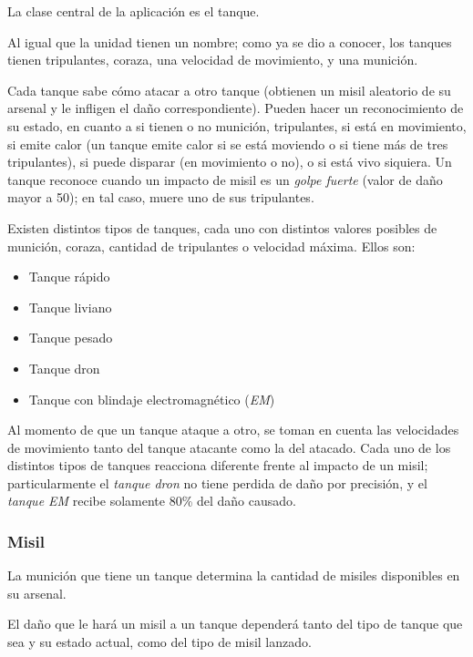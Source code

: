 La clase central de la aplicación es el tanque. 

Al igual que la unidad tienen un nombre; como ya se dio a conocer, los tanques tienen tripulantes, coraza, una velocidad de movimiento, y una munición.

Cada tanque sabe cómo atacar a otro tanque (obtienen un misil aleatorio de su arsenal y le infligen el daño correspondiente). Pueden hacer un reconocimiento de su estado, en cuanto a si tienen o no munición, tripulantes, si está en movimiento, si emite calor (un tanque emite calor si se está moviendo o si tiene más de tres tripulantes), si puede disparar (en movimiento o no), o si está vivo siquiera. Un tanque reconoce cuando un impacto de misil es un \emph{golpe fuerte} (valor de daño mayor a 50); en tal caso, muere uno de sus tripulantes.

Existen distintos tipos de tanques, cada uno con distintos valores posibles de munición, coraza, cantidad de tripulantes o velocidad máxima. Ellos son:

\begin{itemize}
    \item Tanque rápido
    \item Tanque liviano
    \item Tanque pesado
    \item Tanque dron
    \item Tanque con blindaje electromagnético (\emph{EM})
\end{itemize}

Al momento de que un tanque ataque a otro, se toman en cuenta las velocidades de movimiento tanto del tanque atacante como la del atacado. Cada uno de los distintos tipos de tanques reacciona diferente frente al impacto de un misil; particularmente el \emph{tanque dron} no tiene perdida de daño por precisión, y el \emph{tanque EM} recibe solamente 80\% del daño causado.


\subsubsection{Misil}

La munición que tiene un tanque determina la cantidad de misiles disponibles en su arsenal.

El daño que le hará un misil a un tanque dependerá tanto del tipo de tanque que sea y su estado actual, como del tipo de misil lanzado. 

